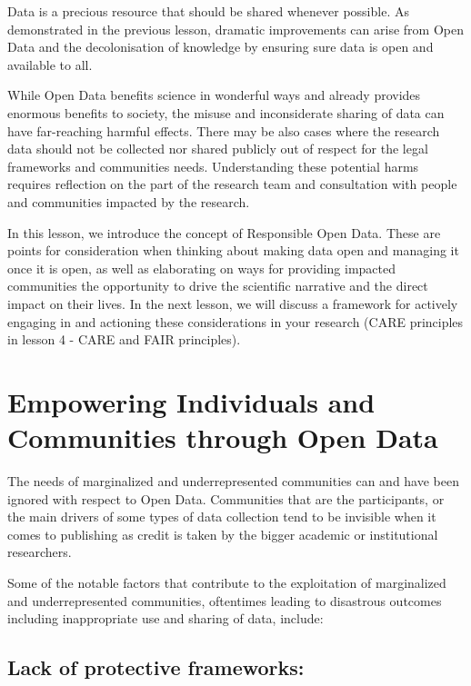 \documentclass[
  letterpaper,
  DIV=11,
  numbers=noendperiod]{scrreport}
\begin{document}
Data is a precious resource that should be shared whenever possible. As
demonstrated in the previous lesson, dramatic improvements can arise
from Open Data and the decolonisation of knowledge by ensuring sure data
is open and available to all.

While Open Data benefits science in wonderful ways and already provides
enormous benefits to society, the misuse and inconsiderate sharing of
data can have far-reaching harmful effects. There may be also cases
where the research data should not be collected nor shared publicly out
of respect for the legal frameworks and communities needs. Understanding
these potential harms requires reflection on the part of the research
team and consultation with people and communities impacted by the
research.

In this lesson, we introduce the concept of Responsible Open Data. These
are points for consideration when thinking about making data open and
managing it once it is open, as well as elaborating on ways for
providing impacted communities the opportunity to drive the scientific
narrative and the direct impact on their lives. In the next lesson, we
will discuss a framework for actively engaging in and actioning these
considerations in your research (CARE principles in lesson 4 - CARE and
FAIR principles).

\hypertarget{empowering-individuals-and-communities-through-open-data}{%
\section{Empowering Individuals and Communities through Open
Data}\label{empowering-individuals-and-communities-through-open-data}}

The needs of marginalized and underrepresented communities can and have
been ignored with respect to Open Data. Communities that are the
participants, or the main drivers of some types of data collection tend
to be invisible when it comes to publishing as credit is taken by the
bigger academic or institutional researchers.

Some of the notable factors that contribute to the exploitation of
marginalized and underrepresented communities, oftentimes leading to
disastrous outcomes including inappropriate use and sharing of data,
include:

\hypertarget{lack-of-protective-frameworks}{%
\subsection{Lack of protective
frameworks:}\label{lack-of-protective-frameworks}}
\end{document}
